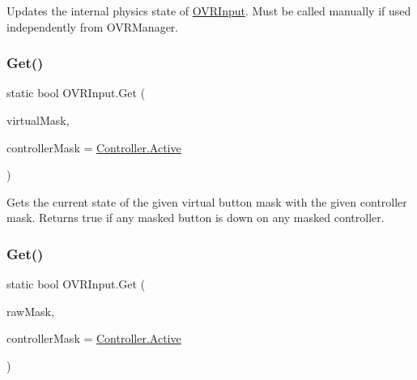 Updates the internal physics state of \mbox{\hyperlink{class_o_v_r_input}{O\+V\+R\+Input}}. Must be called manually if used independently from O\+V\+R\+Manager. 

\mbox{\label{class_o_v_r_input_a8ed5f1b79ace01d32a26c222aa64c50c}} 
\subsubsection{\texorpdfstring{Get()}{Get()}\hspace{0.1cm}{\footnotesize\ttfamily [1/10]}}
{\footnotesize\ttfamily static bool O\+V\+R\+Input.\+Get (\begin{DoxyParamCaption}\item[{\mbox{\hyperlink{class_o_v_r_input_aed3cf5b4b5e0669cea0941f61e018ee5}{Button}}}]{virtual\+Mask,  }\item[{\mbox{\hyperlink{class_o_v_r_input_a5c86f9052a9cbb0b73779ff5704d60a8}{Controller}}}]{controller\+Mask = {\ttfamily \mbox{\hyperlink{class_o_v_r_input_a5c86f9052a9cbb0b73779ff5704d60a8a4d3d769b812b6faa6b76e1a8abaece2d}{Controller.\+Active}}} }\end{DoxyParamCaption})\hspace{0.3cm}{\ttfamily [static]}}



Gets the current state of the given virtual button mask with the given controller mask. Returns true if any masked button is down on any masked controller. 

\mbox{\label{class_o_v_r_input_abf55006f2fbc436561df178f7cb5a45a}} 
\subsubsection{\texorpdfstring{Get()}{Get()}\hspace{0.1cm}{\footnotesize\ttfamily [2/10]}}
{\footnotesize\ttfamily static bool O\+V\+R\+Input.\+Get (\begin{DoxyParamCaption}\item[{\mbox{\hyperlink{class_o_v_r_input_a9d6423af820e22b93f0b33a4fc4bf77a}{Raw\+Button}}}]{raw\+Mask,  }\item[{\mbox{\hyperlink{class_o_v_r_input_a5c86f9052a9cbb0b73779ff5704d60a8}{Controller}}}]{controller\+Mask = {\ttfamily \mbox{\hyperlink{class_o_v_r_input_a5c86f9052a9cbb0b73779ff5704d60a8a4d3d769b812b6faa6b76e1a8abaece2d}{Controller.\+Active}}} }\end{DoxyParamCaption})\hspace{0.3cm}{\ttfamily [static]}}



